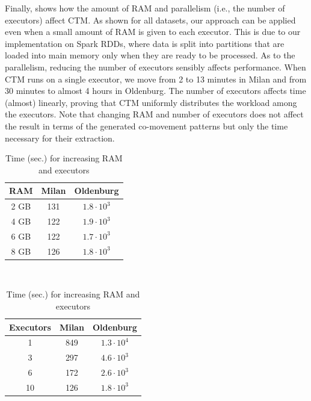 \documentclass[preprint,12pt,authoryear]{elsarticle} %
\renewcommand{\sf}[1]{\textsf{\textup{#1}}}
\begin{document}
Finally,  shows how the amount of RAM and parallelism (i.e., the number of executors) affect CTM.
As shown for all datasets, our approach can be applied even when a small amount of RAM is given to each executor.
This is due to our implementation on Spark RDDs, where data is split into partitions that are loaded into main memory only when they are ready to be processed.
As to the parallelism, reducing the number of executors sensibly affects performance.
When CTM runs on a single executor, we move from 2 to 13 minutes in \sf{Milan} and from 30 minutes to almost 4 hours in \sf{Oldenburg}.
The number of executors affects time (almost) linearly, proving that CTM uniformly distributes the workload among the executors.
Note that changing RAM and number of executors does not affect the result in terms of the generated co-movement patterns but only the time necessary for their extraction.

\begin{table}[t]
\scriptsize\centering
\caption{Time (sec.) for increasing RAM and executors}
\label{tab:efframexec}%

\begin{tabular}{ccc}
\toprule
RAM &  \sf{Milan} &  \sf{Oldenburg} \\%
\midrule
2 GB & 131 & $1.8\cdot10^{3}$ \\%
4 GB & 122 & $1.9\cdot10^{3}$ \\%
6 GB & 122 & $1.7\cdot10^{3}$ \\%
8 GB & 126 & $1.8\cdot10^{3}$ \\%
\bottomrule
\end{tabular}
~
\begin{tabular}{ccc}
\toprule
Executors & \sf{Milan} & \sf{Oldenburg} \\%
\midrule
1  & 849 & $1.3\cdot10^{4}$ \\%
3  & 297 & $4.6\cdot10^{3}$ \\%
6  & 172 & $2.6\cdot10^{3}$ \\%
10 & 126 & $1.8\cdot10^{3}$ \\%
\bottomrule
\end{tabular}
\end{table}%
 
\end{document}
